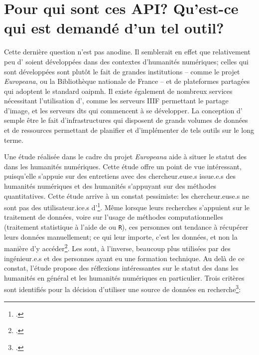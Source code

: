 \section{Pour qui sont ces API? Qu'est-ce qui est demandé d'un tel outil?}
Cette dernière question n'est pas anodine. Il semblerait en effet que relativement peu d'\api{} soient développées dans des contextes d'humanités numériques; celles qui sont développées sont plutôt le fait de grandes institutions -- comme le projet \textit{Europeana}, ou la Bibliothèque nationale de France -- et de plateformes partagées qui adoptent le standard \gls{oaipmh}. Il existe également de nombreux services nécessitant l'utilisation d'\api{}, comme les serveurs IIIF permettant le partage d'image, et les serveurs \gls{dts} qui commencent à se développer. La conception d'\api{} semple être le fait d'infrastructures qui disposent de grands volumes de données et de ressources permettant de planifier et d'implémenter de tels outils sur le long terme. 

Une étude réalisée dans le cadre du projet \textit{Europeana} aide à situer le statut des \api{} dans les humanités numériques. Cette étude offre un point de vue intéressant, puisqu'elle s'appuie sur des entretiens avec des chercheur.euse.s issue.e.s des humanités numériques et des humanités s'appuyant sur des méthodes quantitatives. Cette étude arrive à un constat pessimiste: les chercheur.euse.s ne sont pas des utilisateur.ice.s d'\api{}\footcite[p. 288]{edmond_apis_2015}. Même lorsque leurs recherches s'appuient sur le traitement de données, voire sur l'usage de méthodes computationnelles (traitement statistique à l'aide de \py{} ou \texttt{R}), ces personnes ont tendance à récupérer leurs données manuellement; ce qui leur importe, c'est les données, et non la manière d'y accéder\footcite[p. 290]{edmond_apis_2015}. Les \api{} sont, à l'inverse, beaucoup plus utilisées par des ingénieur.e.s et des personnes ayant eu une formation technique. Au delà de ce constat, l'étude propose des réflexions intéressantes sur le statut des \api{} dans les humanités en général et les humanités numériques en particulier. Trois critères sont identifiés pour la décision d'utiliser une source de données en recherche\footcite[p. 292-294]{edmond_apis_2015}:

